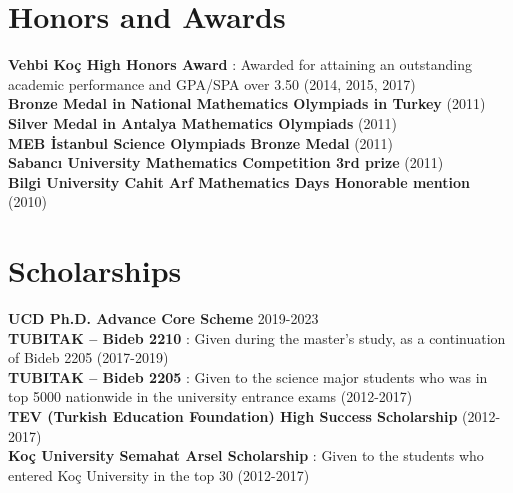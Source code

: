 \documentclass[letterpaper,11pt]{article}
\begin{document}
\section{Honors and Awards}
\textbf{Vehbi Koç High Honors Award} {: Awarded for attaining an outstanding academic performance and GPA/SPA over 3.50 (2014, 2015, 2017)}\\
\textbf{Bronze Medal in National Mathematics Olympiads in Turkey} {(2011)}\\
\textbf{Silver Medal in Antalya Mathematics Olympiads} {(2011)}\\
\textbf{MEB İstanbul Science Olympiads Bronze Medal} {(2011)}\\
\textbf{Sabancı University Mathematics Competition 3rd prize} {(2011)}\\
\textbf{Bilgi University Cahit Arf Mathematics Days Honorable mention} {(2010)}


\section{Scholarships}
\textbf{UCD Ph.D. Advance Core Scheme} {2019-2023} \\
\textbf{TUBITAK – Bideb 2210} {: Given during the master’s study, as a continuation of Bideb 2205 (2017-2019)}\\
\textbf{TUBITAK – Bideb 2205} {: Given to the science major students who was in top 5000 nationwide in the university entrance exams (2012-2017)}\\
\textbf{TEV (Turkish Education Foundation) High Success Scholarship} {(2012-2017)}\\
\textbf{Koç University Semahat Arsel Scholarship} {: Given to the students who entered Koç University in the top 30 (2012-2017)}
\end{document}
